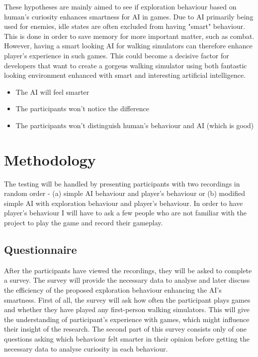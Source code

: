 \documentclass[journal]{IEEEtran}
\begin{document}
These hypotheses are mainly aimed to see if exploration behaviour based on human's curiosity enhances smartness for AI in games. Due to AI primarily being used for enemies, idle states are often excluded from having "smart" behaviour. This is done in order to save memory for more important matter, such as combat. However, having a smart looking AI for walking simulators can therefore enhance player's experience in such games. This could become a decisive factor for developers that want to create a gorgeus walking simulator using both fantastic looking environment enhanced with smart and interesting artificial intelligence.
\begin{itemize}
	\item The AI will feel smarter
	\item The participants won't notice the difference
	\item The participants won't distinguish human's behaviour and AI (which is good)
\end{itemize}

\section{Methodology}
The testing will be handled by presenting participants with two recordings in random order - (a) simple AI behaviour and player's behaviour or (b) modified simple AI with exploration behaviour and player's behaviour. In order to have player's behaviour I will have to ask a few people who are not familiar with the project to play the game and record their gameplay. 



\subsection{Questionnaire}
After the participants have viewed the recordings, they will be asked to complete a survey. The survey will provide the necessary data to analyse and later discuss the efficiency of the proposed exploration behaviour enhancing the AI's smartness. First of all, the survey will ask how often the participant plays games and whether they have played any first-person walking simulators. This will give the understanding of participant's experience with games, which might influence their insight of the research. The second part of this survey consists only of one questions asking which behaviour felt smarter in their opinion before getting the necessary data to analyse curiosity in each behaviour.
\end{document}
